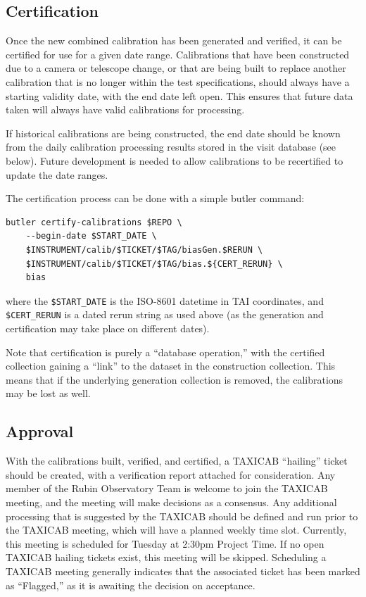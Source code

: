 \documentclass[DM,authoryear,toc]{lsstdoc}
\begin{document}
\subsection{Certification}

Once the new combined calibration has been generated and verified, it can be certified for use for a given date range.
Calibrations that have been constructed due to a camera or telescope change, or that are being built to replace another calibration that is no longer within the test specifications, should always have a starting validity date, with the end date left open.
This ensures that future data taken will always have valid calibrations for processing.

If historical calibrations are being constructed, the end date should be known from the daily calibration processing results stored in the visit database (see below).
Future development is needed to allow calibrations to be recertified to update the date ranges.

The certification process can be done with a simple butler command:
\begin{verbatim}
butler certify-calibrations $REPO \
    --begin-date $START_DATE \
    $INSTRUMENT/calib/$TICKET/$TAG/biasGen.$RERUN \
    $INSTRUMENT/calib/$TICKET/$TAG/bias.${CERT_RERUN} \
    bias
\end{verbatim}
where the \verb|$START_DATE| is the ISO-8601 datetime in TAI coordinates, and \verb|$CERT_RERUN| is a dated rerun string as used above (as the generation and certification may take place on different dates).

Note that certification is purely a ``database operation,'' with the certified collection gaining a ``link'' to the dataset in the construction collection.
This means that if the underlying generation collection is removed, the calibrations may be lost as well.

\subsection{Approval}

With the calibrations built, verified, and certified, a TAXICAB ``hailing'' ticket should be created, with a verification report attached for consideration.
Any member of the Rubin Observatory Team is welcome to join the TAXICAB meeting, and the meeting will make decisions as a consensus.
Any additional processing that is suggested by the TAXICAB should be defined and run prior to the TAXICAB meeting, which will have a planned weekly time slot.
Currently, this meeting is scheduled for Tuesday at 2:30pm Project Time.
If no open TAXICAB hailing tickets exist, this meeting will be skipped.
Scheduling a TAXICAB meeting generally indicates that the associated ticket has been marked as ``Flagged,'' as it is awaiting the decision on acceptance.
\end{document}
